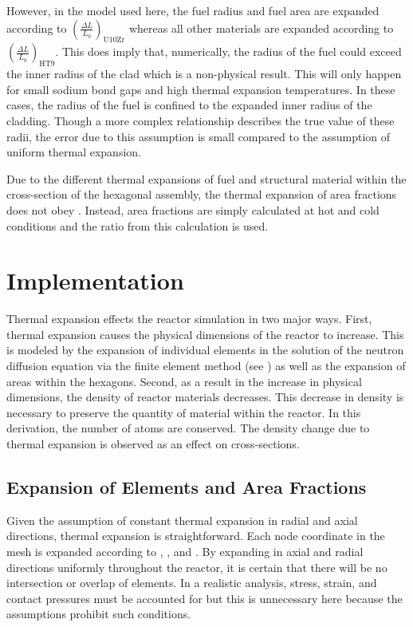   However, in the model used here, the fuel radius and fuel area
  are expanded according to $\left(\frac{\Delta L}{L_0}\right)_{\text{U10Zr}}$
  whereas all other materials are expanded according to 
  $\left(\frac{\Delta L}{L_0}\right)_{\text{HT9}}$. This does imply that,
  numerically, the radius of the fuel could exceed the inner radius of the clad
  which is a non-physical result. This will only happen for small sodium bond
  gaps and high thermal expansion temperatures. In these cases, the radius of
  the fuel is confined to the expanded inner radius of the cladding. Though a
  more complex relationship describes the true value of these radii, the error
  due to this assumption is small compared to the assumption of uniform thermal
  expansion.
  
  Due to the different thermal expansions of fuel and structural material within
  the cross-section of the hexagonal assembly, the thermal expansion of area 
  fractions does not obey . Instead, area fractions
  are simply calculated at hot and cold conditions and the ratio from this
  calculation is used.





  
  


\section{Implementation}
  Thermal expansion effects the reactor simulation in two major ways. First,
  thermal expansion causes the physical dimensions of the reactor to increase. 
  This is modeled by the expansion of individual elements in the solution of the
  neutron diffusion equation via the finite element method (see
  ) as well as the expansion of areas within the 
  hexagons.  Second, as a result in the increase in physical dimensions, the 
  density of reactor materials decreases. This decrease in density is necessary
  to preserve the quantity of material within the reactor. In this derivation,
  the number of atoms are conserved. The density change due to thermal expansion 
  is observed as an effect on cross-sections.

  \subsection{Expansion of Elements and Area Fractions}
    Given the assumption of constant thermal expansion in radial and axial
    directions, thermal expansion is straightforward. Each node coordinate in
    the mesh is expanded according to , ,
    and . By expanding in axial and radial directions
    uniformly throughout the reactor, it is certain that there will be no
    intersection or overlap of elements. In a realistic analysis, stress,
    strain, and contact pressures must be accounted for but this is unnecessary
    here because the assumptions prohibit such conditions.

